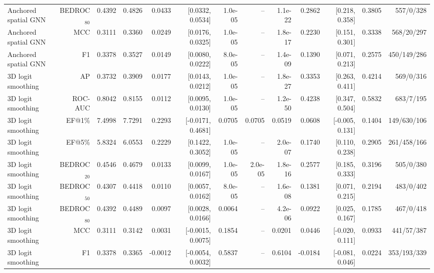 \begin{table}[t]
\begin{tabular}{lrrrrrrrrrrrr}
Anchored spatial GNN & BEDROC$_{80}$ & 0.4392 & 0.4826 & 0.0433 & [0.0332, 0.0534] & 1.0e-05 & -- & 1.1e-22 & 0.2862 & [0.218, 0.358] & 0.3805 & 557/0/328 \\
Anchored spatial GNN & MCC & 0.3111 & 0.3360 & 0.0249 & [0.0176, 0.0325] & 1.0e-05 & -- & 1.8e-17 & 0.2230 & [0.151, 0.301] & 0.3338 & 568/20/297 \\
Anchored spatial GNN & F1 & 0.3378 & 0.3527 & 0.0149 & [0.0080, 0.0222] & 8.0e-05 & -- & 1.4e-09 & 0.1390 & [0.071, 0.213] & 0.2575 & 450/149/286 \\
3D logit smoothing & AP & 0.3732 & 0.3909 & 0.0177 & [0.0143, 0.0212] & 1.0e-05 & -- & 1.8e-27 & 0.3353 & [0.263, 0.411] & 0.4214 & 569/0/316 \\
3D logit smoothing & ROC-AUC & 0.8042 & 0.8155 & 0.0112 & [0.0095, 0.0130] & 1.0e-05 & -- & 1.2e-50 & 0.4238 & [0.347, 0.504] & 0.5832 & 683/7/195 \\
3D logit smoothing & EF@1\% & 7.4998 & 7.7291 & 0.2293 & [-0.0171, 0.4681] & 0.0705 & 0.0705 & 0.0519 & 0.0608 & [-0.005, 0.131] & 0.1404 & 149/630/106 \\
3D logit smoothing & EF@5\% & 5.8324 & 6.0553 & 0.2229 & [0.1422, 0.3052] & 1.0e-05 & -- & 2.0e-07 & 0.1740 & [0.110, 0.238] & 0.2905 & 261/458/166 \\
3D logit smoothing & BEDROC$_{20}$ & 0.4546 & 0.4679 & 0.0133 & [0.0099, 0.0167] & 1.0e-05 & 2.0e-05 & 1.8e-16 & 0.2577 & [0.185, 0.333] & 0.3196 & 505/0/380 \\
3D logit smoothing & BEDROC$_{50}$ & 0.4307 & 0.4418 & 0.0110 & [0.0057, 0.0162] & 8.0e-05 & -- & 1.6e-08 & 0.1381 & [0.071, 0.215] & 0.2194 & 483/0/402 \\
3D logit smoothing & BEDROC$_{80}$ & 0.4392 & 0.4489 & 0.0097 & [0.0028, 0.0166] & 0.0064 & -- & 4.2e-06 & 0.0922 & [0.025, 0.167] & 0.1785 & 467/0/418 \\
3D logit smoothing & MCC & 0.3111 & 0.3142 & 0.0031 & [-0.0015, 0.0075] & 0.1854 & -- & 0.0201 & 0.0446 & [-0.020, 0.111] & 0.0933 & 441/57/387 \\
3D logit smoothing & F1 & 0.3378 & 0.3365 & -0.0012 & [-0.0054, 0.0032] & 0.5837 & -- & 0.6104 & -0.0184 & [-0.081, 0.046] & 0.0224 & 353/193/339 \\
\bottomrule
\end{tabular}
\end{table}
